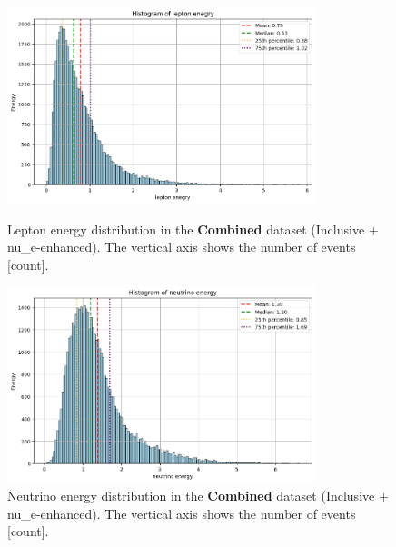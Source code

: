 \documentclass{pracalicmgr}
\begin{document}
\begin{figure}[H]
    \centering
    \begin{minipage}[t]{0.48\textwidth}
        \centering
        \includegraphics[width=0.8\textwidth]{src/leptonFull.png}
        \caption{Lepton energy distribution in the \textbf{Combined} dataset (Inclusive + nu\_e-enhanced). The vertical axis shows the number of events [count].}
        \label{fig:lepton-combined}
    \end{minipage}
    \hfill
    \begin{minipage}[t]{0.48\textwidth}
    \centering
    \includegraphics[width=0.8\textwidth]{src/neutrinoFull.png}
    \caption{Neutrino energy distribution in the \textbf{Combined} dataset (Inclusive + nu\_e-enhanced). The vertical axis shows the number of events [count].}
    \label{fig:neutrino-combined}
    \end{minipage}
\end{figure}
\end{document}
